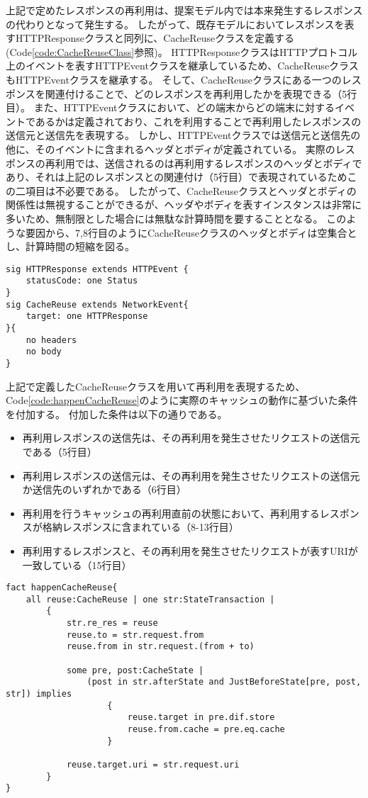 \documentclass[journal]{IEEEtran}
\begin{document}
上記で定めたレスポンスの再利用は、提案モデル内では本来発生するレスポンスの代わりとなって発生する。
したがって、既存モデルにおいてレスポンスを表すHTTPResponseクラスと同列に、CacheReuseクラスを定義する(Code\ref{code:CacheReuseClass}参照)。
HTTPResponseクラスはHTTPプロトコル上のイベントを表すHTTPEventクラスを継承しているため、CacheReuseクラスもHTTPEventクラスを継承する。
そして、CacheReuseクラスにある一つのレスポンスを関連付けることで、どのレスポンスを再利用したかを表現できる（5行目）。
また、HTTPEventクラスにおいて、どの端末からどの端末に対するイベントであるかは定義されており、これを利用することで再利用したレスポンスの送信元と送信先を表現する。
しかし、HTTPEventクラスでは送信元と送信先の他に、そのイベントに含まれるヘッダとボディが定義されている。
実際のレスポンスの再利用では、送信されるのは再利用するレスポンスのヘッダとボディであり、それは上記のレスポンスとの関連付け（5行目）で表現されているためこの二項目は不必要である。
したがって、CacheReuseクラスとヘッダとボディの関係性は無視することができるが、ヘッダやボディを表すインスタンスは非常に多いため、無制限とした場合には無駄な計算時間を要することとなる。
このような要因から、7,8行目のようにCacheReuseクラスのヘッダとボディは空集合とし、計算時間の短縮を図る。

\begin{lstlisting}[caption=CacheReuseクラス, label=code:CacheReuseClass]
sig HTTPResponse extends HTTPEvent {
	statusCode: one Status
}
sig CacheReuse extends NetworkEvent{
	target: one HTTPResponse
}{
	no headers
	no body
}
\end{lstlisting}

上記で定義したCacheReuseクラスを用いて再利用を表現するため、Code\ref{code:happenCacheReuse}のように実際のキャッシュの動作に基づいた条件を付加する。
付加した条件は以下の通りである。
\begin{itemize}
\item 再利用レスポンスの送信先は、その再利用を発生させたリクエストの送信元である（5行目）
\item 再利用レスポンスの送信元は、その再利用を発生させたリクエストの送信元か送信先のいずれかである（6行目）
\item 再利用を行うキャッシュの再利用直前の状態において、再利用するレスポンスが格納レスポンスに含まれている（8-13行目）
\item 再利用するレスポンスと、その再利用を発生させたリクエストが表すURIが一致している（15行目）
\end{itemize}

\begin{lstlisting}[caption=CacheReuseの発生条件, label=code:happenCacheReuse]
fact happenCacheReuse{
	all reuse:CacheReuse | one str:StateTransaction |
		{
			str.re_res = reuse
			reuse.to = str.request.from
			reuse.from in str.request.(from + to)

			some pre, post:CacheState |
				(post in str.afterState and JustBeforeState[pre, post, str]) implies
					{
						reuse.target in pre.dif.store
						reuse.from.cache = pre.eq.cache
					}

			reuse.target.uri = str.request.uri
		}
}
\end{lstlisting}
\end{document}
